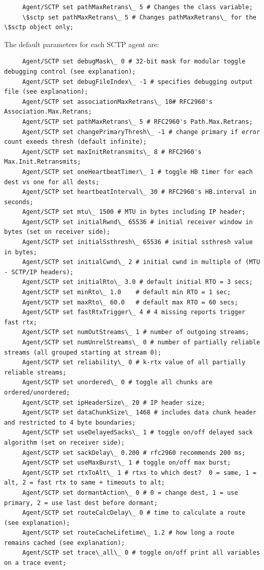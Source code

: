 	 \begin{verbatim}
	 Agent/SCTP set pathMaxRetrans\_ 5 # Changes the class variable; 
	 \$sctp set pathMaxRetrans\_ 5 # Changes pathMaxRetrans\_ for the \$sctp object only; 
         \end{verbatim}

	 The default parameters for each SCTP agent are:

	 \begin{verbatim}
	 Agent/SCTP set debugMask\_ 0 # 32-bit mask for modular toggle debugging control (see explanation);
	 Agent/SCTP set debugFileIndex\_ -1 # specifies debugging output file (see explanation);
	 Agent/SCTP set associationMaxRetrans\_ 10# RFC2960's Association.Max.Retrans;
	 Agent/SCTP set pathMaxRetrans\_ 5 # RFC2960's Path.Max.Retrans;
	 Agent/SCTP set changePrimaryThresh\_ -1 # change primary if error count exeeds thresh (default infinite);
	 Agent/SCTP set maxInitRetransmits\_ 8 # RFC2960's Max.Init.Retransmits;
	 Agent/SCTP set oneHeartbeatTimer\_ 1 # toggle HB timer for each dest vs one for all dests;
	 Agent/SCTP set heartbeatInterval\_ 30 # RFC2960's HB.interval in seconds;
	 Agent/SCTP set mtu\_ 1500 # MTU in bytes including IP header;
	 Agent/SCTP set initialRwnd\_ 65536 # initial receiver window in bytes (set on receiver side);
	 Agent/SCTP set initialSsthresh\_ 65536 # initial ssthresh value in bytes;
	 Agent/SCTP set initialCwnd\_ 2 # initial cwnd in multiple of (MTU - SCTP/IP headers);
	 Agent/SCTP set initialRto\_ 3.0 # default initial RTO = 3 secs;
	 Agent/SCTP set minRto\_ 1.0    # default min RTO = 1 sec;
	 Agent/SCTP set maxRto\_ 60.0   # default max RTO = 60 secs;
	 Agent/SCTP set fastRtxTrigger\_ 4 # 4 missing reports trigger fast rtx;
	 Agent/SCTP set numOutStreams\_ 1 # number of outgoing streams;
	 Agent/SCTP set numUnrelStreams\_ 0 # number of partially reliable streams (all grouped starting at stream 0);
	 Agent/SCTP set reliability\_ 0 # k-rtx value of all partially reliable streams;
	 Agent/SCTP set unordered\_ 0 # toggle all chunks are ordered/unordered;
	 Agent/SCTP set ipHeaderSize\_ 20 # IP header size;
	 Agent/SCTP set dataChunkSize\_ 1468 # includes data chunk header and restricted to 4 byte boundaries;
	 Agent/SCTP set useDelayedSacks\_ 1 # toggle on/off delayed sack algorithm (set on receiver side);
	 Agent/SCTP set sackDelay\_ 0.200 # rfc2960 recommends 200 ms;
	 Agent/SCTP set useMaxBurst\_ 1 # toggle on/off max burst;
	 Agent/SCTP set rtxToAlt\_ 1 # rtxs to which dest?  0 = same, 1 = alt, 2 = fast rtx to same + timeouts to alt;
	 Agent/SCTP set dormantAction\_ 0 # 0 = change dest, 1 = use primary, 2 = use last dest before dormant; 
	 Agent/SCTP set routeCalcDelay\_ 0 # time to calculate a route (see explanation);
	 Agent/SCTP set routeCacheLifetime\_ 1.2 # how long a route remains cached (see explanation);
	 Agent/SCTP set trace\_all\_ 0 # toggle on/off print all variables on a trace event;
	 \end{verbatim}

